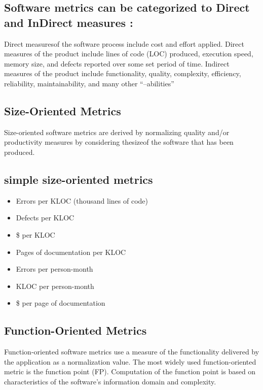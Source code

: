 \documentclass[12pt]{article}
\begin{document}
\subsection{Software metrics can
be categorized to Direct and InDirect measures : }


Direct measuresof the software process include cost and effort applied. Direct
measures of the product include lines of code (LOC) produced, execution speed,
memory size, and defects reported over some set period of time. Indirect measures
of the product include functionality, quality, complexity, efficiency, reliability, maintainability, and many other “–abilities”


\newpage

\subsection{Size-Oriented Metrics}

Size-oriented software metrics are derived by normalizing quality and/or productivity measures by considering thesizeof the software that has been produced.


\subsection{simple size-oriented metrics}

\begin{itemize}
	\item Errors per KLOC (thousand lines of code)
	\item Defects per KLOC
	\item \$ per KLOC
	\item Pages of documentation per KLOC
	\item Errors per person-month
	\item KLOC per person-month
	\item \$ per page of documentation
\end{itemize}




\subsection{Function-Oriented Metrics}

Function-oriented software metrics use a measure of the functionality delivered by
the application as a normalization value. The most widely used function-oriented
metric is the function point (FP). Computation of the function point is based on characteristics of the software’s information domain and complexity.
\end{document}
